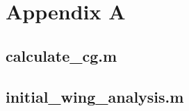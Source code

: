 \chapter{Appendix A}\label{cp:code}

\section{calculate\_cg.m}\label{code:calculate_cg}

{\small}

\newpage

\section{initial\_wing\_analysis.m}\label{code:initial_wing_analysis}

{\small}
